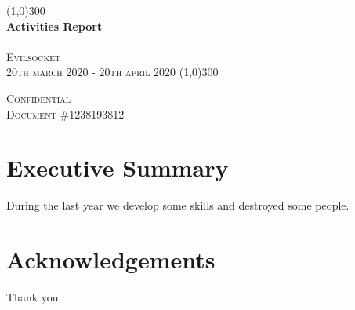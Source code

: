 \documentclass{article}
\begin{document}


\begin{titlepage}

    \begin{center}
        \line(1,0){300} \\ 
        
        \huge{\bfseries Activities Report}\\
        \textsc{\normalsize \\Evilsocket \\20th march 2020 - 20th april 2020}
        \line(1,0){300} \\ 
    \end{center}

    \vspace{10cm}

    \begin{flushright}
       \textsc{\normalsize Confidential\\Document \#1238193812} 
    \end{flushright}
    
\end{titlepage}

\section*{Executive Summary}
During the last year we develop some skills and destroyed some people.
\cleardoublepage

\section*{Acknowledgements}
Thank you
\cleardoublepage

\listoffigures
{}
\cleardoublepage

\listoftables
{}
\cleardoublepage

\tableofcontents
\thispagestyle{empty}
\cleardoublepage
\end{document}
